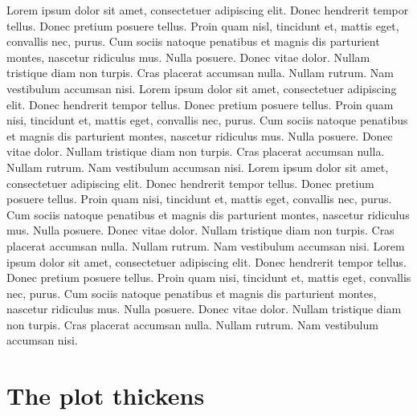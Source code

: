 \documentclass{book}
\begin{document}
Lorem ipsum dolor sit amet, consectetuer adipiscing elit. Donec hendrerit tempor tellus. Donec pretium posuere tellus. Proin quam nisl, tincidunt et, mattis eget, convallis nec, purus. Cum sociis natoque penatibus et magnis dis parturient montes, nascetur ridiculus mus. Nulla posuere. Donec vitae dolor. Nullam tristique diam non turpis. Cras placerat accumsan nulla. Nullam rutrum. Nam vestibulum accumsan nisi.  Lorem ipsum dolor sit amet, consectetuer adipiscing elit. Donec hendrerit tempor tellus. Donec pretium posuere tellus. Proin quam nisi, tincidunt et, mattis eget, convallis nec, purus. Cum sociis natoque penatibus et magnis dis parturient montes, nascetur ridiculus mus. Nulla posuere. Donec vitae dolor. Nullam tristique diam non turpis. Cras placerat accumsan nulla. Nullam rutrum. Nam vestibulum accumsan nisi.  Lorem ipsum dolor sit amet, consectetuer adipiscing elit. Donec hendrerit tempor tellus. Donec pretium posuere tellus. Proin quam nisi, tincidunt et, mattis eget, convallis nec, purus. Cum sociis natoque penatibus et magnis dis parturient montes, nascetur ridiculus mus. Nulla posuere. Donec vitae dolor. Nullam tristique diam non turpis. Cras placerat accumsan nulla. Nullam rutrum. Nam vestibulum accumsan nisi.   Lorem ipsum dolor sit amet, consectetuer adipiscing elit. Donec hendrerit tempor tellus. Donec pretium posuere tellus. Proin quam nisi, tincidunt et, mattis eget, convallis nec, purus. Cum sociis natoque penatibus et magnis dis parturient montes, nascetur ridiculus mus. Nulla posuere. Donec vitae dolor. Nullam tristique diam non turpis. Cras placerat accumsan nulla. Nullam rutrum. Nam vestibulum accumsan nisi.
  
\chapter{The plot thickens}
\end{document}
